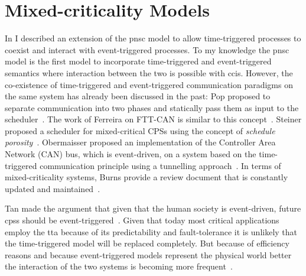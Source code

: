 \section{Mixed-criticality Models}
\label{sect_related_mix}
In \Chap{\ref{chap_tcm}} I described an extension of the \gls{pnsc} model to allow time-triggered processes to coexist and interact with event-triggered processes.
To my knowledge the \gls{pnsc} model is the first model to incorporate time-triggered and event-triggered semantics where interaction between the two is possible with \glspl{cci}.
However, the co-existence of time-triggered and event-triggered communication paradigms on the same system has already been discussed in the past:
Pop \etal proposed to separate communication into two phases and statically pass them as input to the scheduler~\cite{pop2002}.
The work of Ferreira \etal on FTT-CAN is similar to this concept~\cite{ferreira2002}.
Steiner proposed a scheduler for mixed-critical CPSs using the concept of \emph{schedule porosity}~\cite{steiner2011}.
Obermaisser proposed an implementation of the Controller Area Network (CAN) bus, which is event-driven, on a system based on the time-triggered communication principle using a tunnelling approach~\cite{obermaisser2006}.
In terms of mixed-criticality systems, Burns \etal provide a review document that is constantly updated and maintained~\cite{burns2016}.

Tan \etal made the argument that given that the human society is event-driven, future \glspl{cps} should be event-triggered~\cite{tan2008}.
Given that today most critical applications employ the \gls{tta} because of its predictability and fault-tolerance it is unlikely that the time-triggered model will be replaced completely.
But because of efficiency reasons and because event-triggered models represent the physical world better the interaction of the two systems is becoming more frequent~\cite{deDinechin2013}.


